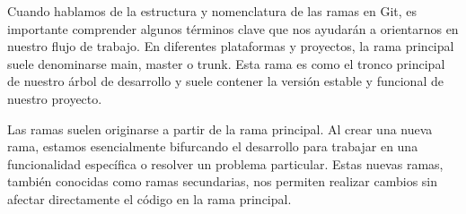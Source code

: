 Cuando hablamos de la estructura y nomenclatura de las ramas en Git, es importante 
comprender algunos términos clave que nos ayudarán a orientarnos en nuestro flujo 
de trabajo. En diferentes plataformas y proyectos, la rama principal suele denominarse 
main, master o trunk. Esta rama es como el tronco principal de nuestro árbol de 
desarrollo y suele contener la versión estable y funcional de nuestro proyecto.


Las ramas suelen originarse a partir de la rama principal. Al crear una nueva rama,
estamos esencialmente bifurcando el desarrollo para trabajar en una funcionalidad 
específica o resolver un problema particular. Estas nuevas ramas, también conocidas 
como ramas secundarias, nos permiten realizar cambios sin afectar directamente el 
código en la rama principal.

